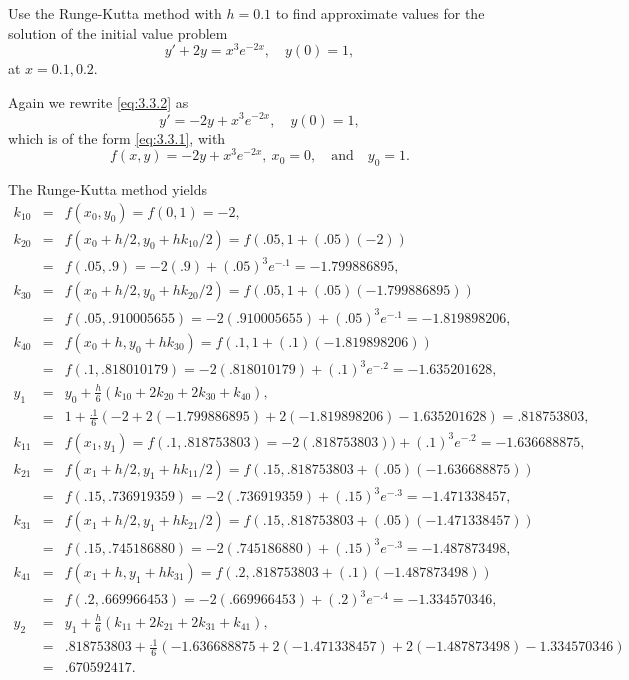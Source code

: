 \documentclass{ximera}
\begin{document}
\begin{example}\label{example:3.3.1}
Use the Runge-Kutta method with $h=0.1$ to find approximate values for
the solution of the initial value problem
\begin{equation}\label{eq:3.3.2}
y'+2y=x^3e^{-2x},\quad y(0)=1,
\end{equation}
at $x=0.1,0.2$.


\begin{explanation}
Again we rewrite \eqref{eq:3.3.2}  as
$$
y'=-2y+x^3e^{-2x},\quad y(0)=1,
$$
which is of the form \eqref{eq:3.3.1}, with
$$
f(x,y)=-2y+x^3e^{-2x},\ x_0=0,\quad\mbox{and}\quad y_0=1.
$$

The Runge-Kutta method yields
\begin{eqnarray*}
k_{10} & = & f(x_0,y_0)
  = f(0,1)=-2,\\
k_{20} & = & f(x_0+h/2,y_0+hk_{10}/2)=f(.05,1+(.05)(-2))\\
 &=& f(.05,.9)=-2(.9)+(.05)^3e^{-.1}=-1.799886895,\\
k_{30} & = & f(x_0+h/2,y_0+hk_{20}/2)=f(.05,1+(.05)(-1.799886895))\\
 &=& f(.05,.910005655)=-2(.910005655)+(.05)^3e^{-.1}=-1.819898206,\\
k_{40} & = & f(x_0+h,y_0+hk_{30})=f(.1,1+(.1)(-1.819898206))\\
&=&f(.1,.818010179)=-2(.818010179)+(.1)^3e^{-.2}=-1.635201628,\\
y_1&=&y_0+\frac{h}{6}(k_{10}+2k_{20}+2k_{30}+k_{40}),\\
&=&1+\frac{.1}{6}(-2+2(-1.799886895)+2(-1.819898206)
-1.635201628)=.818753803,\\
k_{11} & = & f(x_1,y_1)
  = f(.1,.818753803)=-2(.818753803))+(.1)^3e^{-.2}=-1.636688875,\\
k_{21} & = & f(x_1+h/2,y_1+hk_{11}/2)=f(.15,.818753803+(.05)(-1.636688875))\\
 &=& f(.15,.736919359)=-2(.736919359)+(.15)^3e^{-.3}=-1.471338457,\\
k_{31} & = & f(x_1+h/2,y_1+hk_{21}/2)=f(.15,.818753803+(.05)(-1.471338457))\\
 &=& f(.15,.745186880)=-2(.745186880)+(.15)^3e^{-.3}=-1.487873498,\\
k_{41} & = &
f(x_1+h,y_1+hk_{31})=f(.2,.818753803+(.1)(-1.487873498))\\
&=&f(.2,.669966453)=-2(.669966453)+(.2)^3e^{-.4}=-1.334570346,\\
y_2&=&y_1+\frac{h}{6}(k_{11}+2k_{21}+2k_{31}+k_{41}),\\
&=&.818753803+\frac{.1}{6}(-1.636688875+2(-1.471338457)+2(-1.487873498)-1.334570346)
\\&=&.670592417.
\end{eqnarray*}

\end{explanation}
\end{example}
\end{document}
